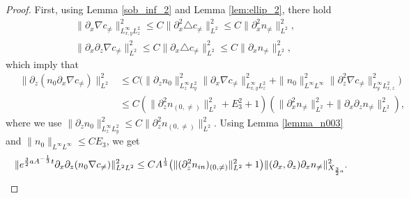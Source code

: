 \documentclass[12pt, reqno]{amsart}
\numberwithin{equation}{section}
\begin{document}
\begin{proof}
		First, 
		using  Lemma \ref{sob_inf_2} and Lemma \ref{lem:ellip_2}, there hold
		\begin{equation*}
			\begin{aligned}
				&\|\partial_x\nabla c_{\neq}\|^2_{L^{\infty}_{x,y}L^2_z}
				\leq C\|\partial_x^2\triangle c_{\neq}\|^2_{L^{2}}
				\leq C\|\partial_x^2n_{\neq}\|^2_{L^{2}},\\
				&\|\partial_x\partial_z\nabla c_{\neq}\|^2_{L^2}
				\leq C\|\partial_x\triangle c_{\neq}\|^2_{L^{2}}
				\leq C\|\partial_xn_{\neq}\|^2_{L^{2}},
			\end{aligned}
		\end{equation*}
		which imply that  
		\begin{equation*}
			\begin{aligned}
				\quad\|\partial_z(n_0\partial_x\nabla c_{\neq})\|^2_{L^2}
				&\leq C\big(\|\partial_zn_0\|^2_{L^{\infty}_{z}L^2_{y}}
				\|\partial_x\nabla c_{\neq}\|^2_{L^{\infty}_{x,y}L^2_{z}}
				+\|n_0\|^2_{L^{\infty}L^{\infty}}
				\|\partial_z^2\nabla c_{\neq}\|^2_{L^{\infty}_{y}L^2_{x,z}}
				\big)\\
				&\leq C(\|\partial_z^2n_{(0,\neq)}\|^2_{L^2}+E_3^2+1)
				\left(\|\partial_x^2n_{\neq}\|^2_{L^{2}}+\|\partial_{x}\partial_{z}n_{\neq}\|^2_{L^{2}}\right),
			\end{aligned}
		\end{equation*}
		where we use $\|\partial_zn_0\|^2_{L^{\infty}_{z}L^2_{y}}
		\leq C\|\partial_z^2n_{(0,\neq)}\|^2_{L^2}.$
		Using Lemma \ref{lemma_n003} and $\|n_0\|_{L^{\infty}L^{\infty}}\leq C E_3$,  we get
		\begin{equation*}
			\begin{aligned}
				\|{\rm e}^{\frac32aA^{-\frac{1}{3}}t}\partial_x
				\partial_z(n_0\nabla c_{\neq})\|^2_{L^2L^2}\leq 
				CA^{\frac13}\big(\|(\partial_z^2n_{\rm in})_{(0,\neq)}\|_{L^2}^2
				+1\big)
				\|(\partial_x,\partial_z)\partial_xn_{\neq}\|^2_{X_{\frac32a}}.
			\end{aligned}
		\end{equation*}
		

\end{proof}
\end{document}
